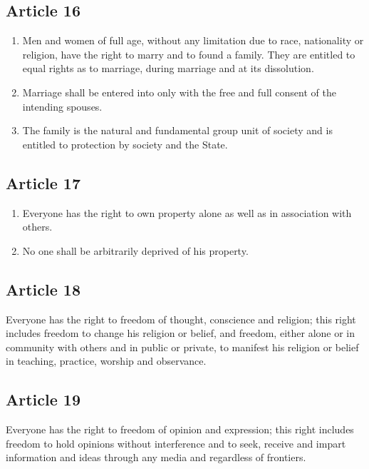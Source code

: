 \documentclass[
  titlepage,
  openright,
  DIV=calc,
  toc=listof,
  listof=nochaptergap]{scrbook}
\begin{document}
\subsection{Article 16}\label{article-16-2}

\begin{enumerate}
\def\labelenumi{\arabic{enumi}.}
\item
  Men and women of full age, without any limitation due to race,
  nationality or religion, have the right to marry and to found a
  family. They are entitled to equal rights as to marriage, during
  marriage and at its dissolution.
\item
  Marriage shall be entered into only with the free and full consent of
  the intending spouses.
\item
  The family is the natural and fundamental group unit of society and is
  entitled to protection by society and the State.
\end{enumerate}

\subsection{Article 17}\label{article-17-2}

\begin{enumerate}
\def\labelenumi{\arabic{enumi}.}
\item
  Everyone has the right to own property alone as well as in association
  with others.
\item
  No one shall be arbitrarily deprived of his property.
\end{enumerate}

\subsection{Article 18}\label{article-18-2}

Everyone has the right to freedom of thought, conscience and religion;
this right includes freedom to change his religion or belief, and
freedom, either alone or in community with others and in public or
private, to manifest his religion or belief in teaching, practice,
worship and observance.

\subsection{Article 19}\label{article-19-2}

Everyone has the right to freedom of opinion and expression; this right
includes freedom to hold opinions without interference and to seek,
receive and impart information and ideas through any media and
regardless of frontiers.
\end{document}
